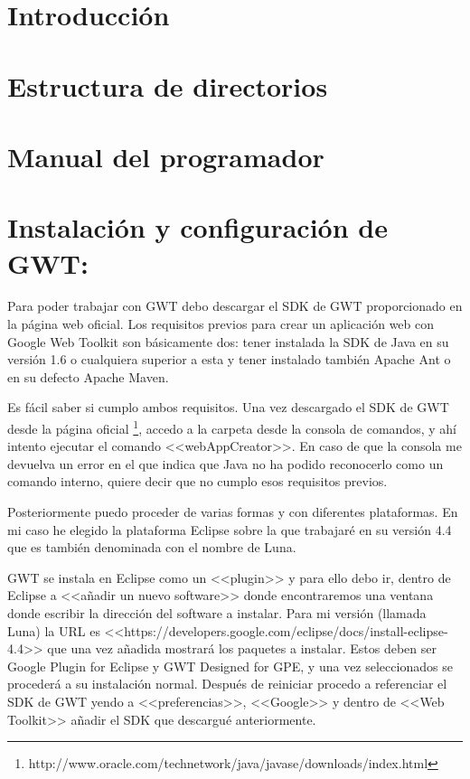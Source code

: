 
\section{Introducción}


\section{Estructura de directorios}

\section{Manual del programador}


\section{Instalación y configuración de GWT:}


Para poder trabajar con GWT debo descargar el SDK de GWT proporcionado en la página web oficial. Los requisitos previos para crear un aplicación web con Google Web Toolkit son básicamente dos: tener instalada la SDK de Java en su versión 1.6 o cualquiera superior a esta y tener instalado también Apache Ant o en su defecto Apache Maven.

Es fácil saber si cumplo ambos requisitos. Una vez descargado el SDK de GWT desde la página oficial \footnote{http://www.oracle.com/technetwork/java/javase/downloads/index.html}, accedo a la carpeta desde la consola de comandos, y ahí intento ejecutar el comando <<webAppCreator>>. En caso de que la consola me devuelva un error en el que indica que Java no ha podido reconocerlo como un comando interno, quiere decir que no cumplo esos requisitos previos.

Posteriormente puedo proceder de varias formas y con diferentes plataformas.
En mi caso he elegido la plataforma Eclipse sobre la que trabajaré en su
versión 4.4 que es también denominada  con el nombre de Luna.

GWT se instala en Eclipse como un <<plugin>> y para ello debo ir, dentro de Eclipse a <<añadir un nuevo software>> donde encontraremos una ventana donde escribir la dirección del software a instalar. Para mi versión (llamada Luna) la URL es <<https://developers.google.com/eclipse/docs/install-eclipse-4.4>> que una vez añadida mostrará los paquetes a instalar. Estos deben ser Google Plugin for Eclipse y GWT Designed for GPE, y una vez seleccionados se procederá a su instalación normal. Después de reiniciar procedo a referenciar el SDK de GWT yendo a <<preferencias>>, <<Google>> y dentro de <<Web Toolkit>> añadir el SDK que descargué anteriormente. 

